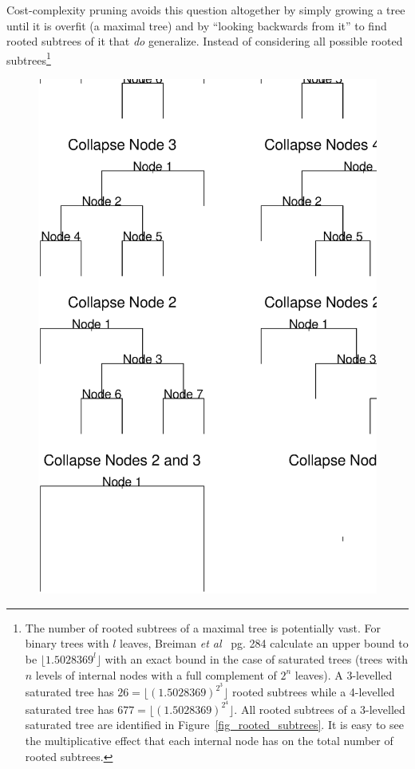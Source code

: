 Cost-complexity pruning avoids this question altogether by simply growing a tree until it is overfit (a maximal tree) and by ``looking backwards from it'' to find rooted subtrees of it that \emph{do} generalize. Instead of considering all possible rooted subtrees\footnote{The number of rooted subtrees of a maximal tree is potentially vast. For binary trees with $l$ leaves, Breiman \emph{et al}~\cite{cart84-2} pg. 284 calculate an upper bound to be $\lfloor 1.5028369^l\rfloor$ with an exact bound in the case of saturated trees (trees with $n$ levels of internal nodes with a full complement of $2^n$ leaves). A 3-levelled saturated tree has $26 = \lfloor (1.5028369)^{2^3}\rfloor$ rooted subtrees while a 4-levelled saturated tree has $677 = \lfloor (1.5028369)^{2^4}\rfloor$. All rooted subtrees of a 3-levelled saturated tree are identified in Figure~\ref{fig_rooted_subtrees}. It is easy to see the multiplicative effect that each internal node has on the total number of rooted subtrees.}\begin{figure}
\centering
\includegraphics[width=1\textwidth]{fig_rooted_subtrees.ps}

\end{figure}
